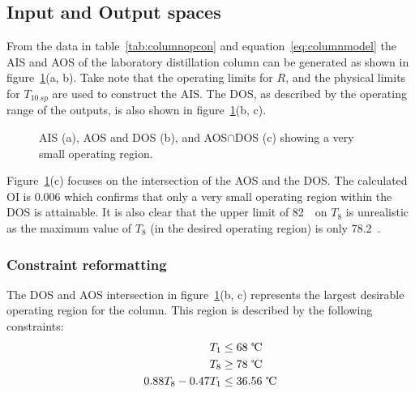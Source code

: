 \documentclass[final,authoryear,5pt,times,twocolumn]{elsarticle}
\begin{document}
\subsection{Input and Output spaces}
From the data in table~\ref{tab:columnopcon} and equation~\ref{eq:columnmodel} the AIS and AOS of the laboratory distillation column can be generated as shown in figure~\ref{fig:columnaisaos}(a, b).
Take note that the operating limits for $R$, and the physical limits for $T_{10~sp}$ are used to construct the AIS.
The DOS, as described by the operating range of the outputs, is also shown in figure~\ref{fig:columnaisaos}(b, c).

\begin{figure}[htbp]
  \centering
    \scalebox{1}{}
    \endpgfgraphicnamed
    \scalebox{1}{}
    \endpgfgraphicnamed
    \scalebox{1}{}
    \endpgfgraphicnamed
  \caption{AIS (a), AOS and DOS (b), and AOS$\cap$DOS (c) showing a very small operating region.}
  \label{fig:columnaisaos}
\end{figure}

Figure~\ref{fig:columnaisaos}(c) focuses on the intersection of the AOS and the DOS.
The calculated OI is 0.006 which confirms that only a very small operating region within the DOS is attainable.
It is also clear that the upper limit of 82~\textcelsius\ on $T_8$ is unrealistic as the maximum value of $T_8$ (in the desired operating region) is only 78.2~\textcelsius.

\subsubsection{Constraint reformatting}
The DOS and AOS intersection in figure~\ref{fig:columnaisaos}(b, c) represents the largest desirable operating region for the column.
This region is described by the following constraints:
\begin{align*}
  T_1 &\leq 68\text{~\textcelsius} \\
  T_8 &\geq 78\text{~\textcelsius} \\
  0.88T_8-0.47T_1&\leq 36.56\text{~\textcelsius}
\end{align*}
\end{document}
